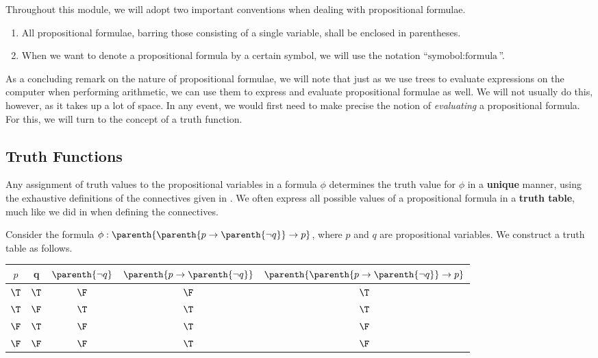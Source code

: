 \begin{boxconvention}
    Throughout this module, we will adopt two important conventions when dealing with propositional formulae.
    \begin{enumerate}[noitemsep]
        \item All propositional formulae, barring those consisting of a single variable, shall be enclosed in parentheses.
        \item When we want to denote a propositional formula by a certain symbol, we will use the notation ``$\text{symobol} : \text{formula}$''.
    \end{enumerate}
\end{boxconvention}

As a concluding remark on the nature of propositional formulae, we will note that just as we use trees to evaluate expressions on the computer when performing arithmetic, we can use them to express and evaluate propositional formulae as well. We will not usually do this, however, as it takes up a lot of space. In any event, we would first need to make precise the notion of \textit{evaluating} a propositional formula. For this, we will turn to the concept of a truth function.

\subsection{Truth Functions}

Any assignment of truth values to the propositional variables in a formula $\phi$ determines the truth value for $\phi$ in a \textbf{unique} manner, using the exhaustive definitions of the connectives given in . We often express all possible values of a propositional formula in a \textbf{truth table}, much like we did in  when defining the connectives.

\begin{boxexample}
    Consider the formula $\phi : \parenth{\parenth{p \to \parenth{\neg q}} \to p}$, where $p$ and $q$ are propositional variables. We construct a truth table as follows.
    \begin{table}[H]
        \centering
        \begin{tabular}{cc|cc|c}
        $p$ & q & $\parenth{\neg q}$ & $\parenth{p \to \parenth{\neg q}}$ & $\parenth{\parenth{p \to \parenth{\neg q}} \to p}$ \\ \hline
        $\T$ & $\T$ & $\F$ & $\F$ & $\T$ \\
        $\T$ & $\F$ & $\T$ & $\T$ & $\T$ \\
        $\F$ & $\T$ & $\F$ & $\T$ & $\F$ \\
        $\F$ & $\F$ & $\F$ & $\T$ & $\F$
        \end{tabular}
    \end{table}
\end{boxexample}

